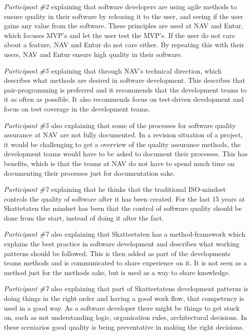 \textit{Participant \#2} explaining that software developers are using agile methods to ensure quality in their software by releasing it to the user, and seeing if the user gains any value from the software. These principles are used at NAV and Entur, which focuses MVP's and let the user test the MVP's. If the user do not care about a feature, NAV and Entur do not care either. By repeating this with their users, NAV and Entur ensure high quality in their software.

\textit{Participant \#5} explaining that through NAV's technical direction, which describes what methods are desired in software development. This describes that pair-programming is preferred and it recommends that the development teams to it as often as possible. It also recommends focus on test-driven development and focus on test coverage in the development teams.

\textit{Participant \#5} also explaining that some of the processes for software quality assurance at NAV are not fully documented. In a revision situation of a project, it would be challenging to get a overview of the quality assurance methods, the development teams would have to be asked to document their processes. This has benefits, which is that the teams at NAV do not have to spend much time on documenting their processes just for documentation sake.

\textit{Participant \#7} explaining that he thinks that the traditional ISO-mindset controls the quality of software after it has been created. For the last 15 years at Skattetaten the mindset has been that the control of software quality should be done from the start, instead of doing it after the fact.

\textit{Participant \#7} also explaining that Skatteetaten has a method-framework which explains the best practice in software development and describes what working patterns should be followed. This is then added as part of the developments teams methods and is communicated to share experience on it. It is not seen as a method just for the methods sake, but is used as a way to share knowledge.

\textit{Participant \#7} also explaining that part of Skatteetatens development patterns is doing things in the right order and having a good work flow, that competency is used in a good way. As a software developer there might be things to get stuck on, such as not understanding logic, organisation rules, architectural decisions. In these sceniarios good quality is being preventative in making the right decisions.

